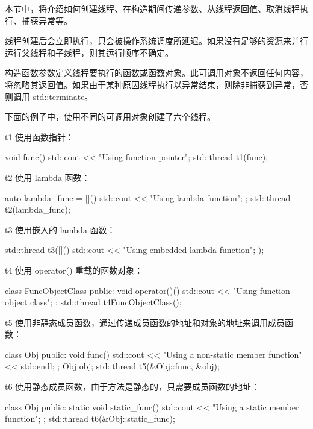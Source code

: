 
本节中，将介绍如何创建线程、在构造期间传递参数、从线程返回值、取消线程执行、捕获异常等。


线程创建后会立即执行，只会被操作系统调度所延迟。如果没有足够的资源来并行运行父线程和子线程，则其运行顺序不确定。

构造函数参数定义线程要执行的函数或函数对象。此可调用对象不返回任何内容，将忽略其返回值。如果由于某种原因线程执行以异常结束，则除非捕获到异常，否则调用 std::terminate。

下面的例子中，使用不同的可调用对象创建了六个线程。

t1 使用函数指针：

\begin{cpp}
void func() {
    std::cout << "Using function pointer\n";
}
std::thread t1(func);
\end{cpp}

t2 使用 lambda 函数：

\begin{cpp}
auto lambda_func = []() {
    std::cout << "Using lambda function\n";
};
std::thread t2(lambda_func);
\end{cpp}

t3 使用嵌入的 lambda 函数：

\begin{cpp}
std::thread t3([]() {
    std::cout << "Using embedded lambda function\n";
});
\end{cpp}

t4 使用 operator() 重载的函数对象：

\begin{cpp}
class FuncObjectClass {
public:
    void operator()() {
        std::cout << "Using function object class\n";
    }
};
std::thread t4{FuncObjectClass()};
\end{cpp}

t5 使用非静态成员函数，通过传递成员函数的地址和对象的地址来调用成员函数：

\begin{cpp}
class Obj {
public:
    void func() {
        std::cout << "Using a non-static member function"
                  << std::endl;
    }
};
Obj obj;
std::thread t5(&Obj::func, &obj);
\end{cpp}

t6 使用静态成员函数，由于方法是静态的，只需要成员函数的地址：

\begin{cpp}
class Obj {
public:
    static void static_func() {
        std::cout << "Using a static member function\n";
    }
};
std::thread t6(&Obj::static_func);
\end{cpp}

